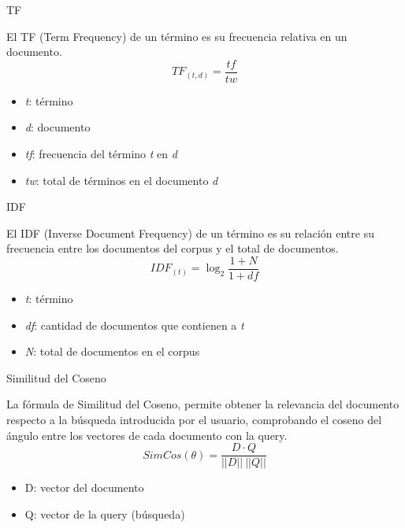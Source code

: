 \documentclass{beamer}
\begin{document}
\begin{frame}{TF}
    \begin{center}
        \large El TF (Term Frequency) de un término es su frecuencia relativa en un documento.
        \begin{equation}
            TF_{(t,d)} = \frac{tf}{tw}
        \end{equation}
        \begin{itemize}
            \item \emph{t}: término
            \item \emph{d}: documento
            \item \emph{tf}: frecuencia del término \emph{t} en \emph{d}
            \item \emph{tw}: total de términos en el documento \emph{d}
        \end{itemize}
        
    \end{center}
\end{frame}


\begin{frame}{IDF}
    \begin{center}
        \large El IDF (Inverse Document Frequency) de un término es su relación entre su frecuencia entre los documentos del corpus y el total de documentos.
        \begin{equation}
            IDF_{(t)} = \log_2\frac{1+N}{1+df}
        \end{equation}
        \begin{itemize}
            \item \emph{t}: término
            \item \emph{df}: cantidad de documentos que contienen a \emph{t}
            \item \emph{N}: total de documentos en el corpus
        \end{itemize}
        
    \end{center}
\end{frame}



\begin{frame}{Similitud del Coseno}
    \begin{center}
        \large La fórmula de Similitud del Coseno, permite obtener la relevancia del
        documento respecto a la búsqueda introducida por el usuario, comprobando el coseno
        del ángulo entre los vectores de cada documento con la query.
        \begin{equation}
            SimCos(\theta) = \frac{D \cdot Q}{||D|| ~ ||Q||}
        \end{equation}
    \end{center}
    \begin{itemize}
        \item D: vector del documento
        \item Q: vector de la query (búsqueda)
    \end{itemize}
\end{frame}
\end{document}
